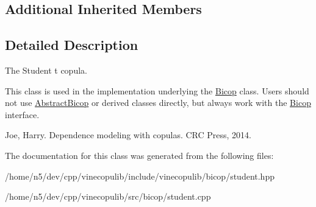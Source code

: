 \subsection*{Additional Inherited Members}


\subsection{Detailed Description}
The Student t copula. 

This class is used in the implementation underlying the \hyperlink{classvinecopulib_1_1_bicop}{Bicop} class. Users should not use \hyperlink{classvinecopulib_1_1_abstract_bicop}{Abstract\+Bicop} or derived classes directly, but always work with the \hyperlink{classvinecopulib_1_1_bicop}{Bicop} interface.

Joe, Harry. Dependence modeling with copulas. C\+RC Press, 2014. 

The documentation for this class was generated from the following files\+:\begin{DoxyCompactItemize}
\item 
/home/n5/dev/cpp/vinecopulib/include/vinecopulib/bicop/student.\+hpp\item 
/home/n5/dev/cpp/vinecopulib/src/bicop/student.\+cpp\end{DoxyCompactItemize}
